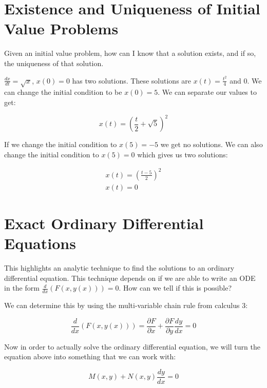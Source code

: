 \section{}

\section{Existence and Uniqueness of Initial Value Problems}

  Given an initial value problem, how can I know that a solution exists, and if so, the uniqueness of that solution.

  \begin{problem}
    $\frac{dx}{dt}=\sqrt{x}$, $x(0)=0$ has two solutions. These solutions are $x(t)=\frac{t^2}{4}$ and $0$. We can change the initial condition to be $x(0)=5$. We can separate our values to get:

    \[
      x(t) =\left(\frac{t}{2} + \sqrt{5}\right)^2
    \]
    
    If we change the initial condition to $x(5)=-5$ we get no solutions. We can also change the initial condition to $x(5)=0$ which gives us two solutions:

    \begin{align*}
      x(t) =\left(\frac{t - 5}{2}\right)^2\\
      x(t) = 0
    \end{align*}
  \end{problem}

\section{Exact Ordinary Differential Equations}

  This highlights an analytic technique to find the solutions to an ordinary differential equation. This technique depends on if we are able to write an ODE in the form $\frac{d}{dx}(F(x,y(x)))=0$. How can we tell if this is possible? 

    We can determine this by using the multi-variable chain rule from calculus 3:

    \[
      \frac{d}{dx}(F(x,y(x))) = \frac{\partial F}{\partial x} + \frac{\partial F}{\partial y} \frac{dy}{dx} = 0 
    \]

    Now in order to actually solve the ordinary differential equation, we will turn the equation above into something that we can work with:

    \[
      M(x,y) + N(x,y)\frac{dy}{dx} = 0
    \]

